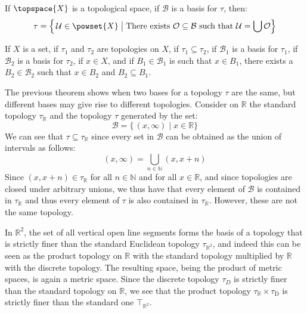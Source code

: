    \begin{theorem}
        If $\topspace{X}$ is a topological space, if $\mathcal{B}$ is a
        basis for $\tau$, then:
        \begin{equation}
            \tau=\Big\{\,\mathcal{U}\in\powset{X}\;\big|\;
                \textrm{There exists }\mathcal{O}\subseteq\mathcal{B}
                \textrm{ such that }\mathcal{U}=\bigcup\mathcal{O}\Big\}
        \end{equation}
    \end{theorem}
    \begin{theorem}
        If $X$ is a set, if $\tau_{1}$ and $\tau_{2}$ are topologies on $X$,
        if $\tau_{1}\subseteq\tau_{2}$, if $\mathcal{B}_{1}$ is a basis for
        $\tau_{1}$, if $\mathcal{B}_{2}$ is a basis for $\tau_{2}$, if
        $x\in{X}$, and if $B_{1}\in\mathcal{B}_{1}$ is such that
        $x\in{B}_{1}$, there exists a $B_{2}\in\mathcal{B}_{2}$ such that
        $x\in{B}_{2}$ and $B_{2}\subseteq{B}_{1}$.
    \end{theorem}
    \begin{example}
        The previous theorem shows when two bases for a topology $\tau$ are
        the same, but different bases may give rise to different topologies.
        Consider on $\mathbb{R}$ the standard topology $\tau_{\mathbb{R}}$
        and the topology $\tau$ generated by the set:
        \begin{equation}
            \mathcal{B}=\{\,(x,\infty)\;|\;x\in\mathbb{R}\}
        \end{equation}
        We can see that $\tau\subseteq\tau_{\mathbb{R}}$ since every set
        in $\mathcal{B}$ can be obtained as the union of intervals as
        follows:
        \begin{equation}
            (x,\infty)=\bigcup_{n\in\mathbb{N}}(x,x+n)
        \end{equation}
        Since $(x,x+n)\in\tau_{\mathbb{R}}$ for all $n\in\mathbb{N}$ and for
        all $x\in\mathbb{R}$, and since topologies are closed under
        arbitrary unions, we thus have that every element of $\mathcal{B}$
        is contained in $\tau_{\mathbb{R}}$ and thus every element of
        $\tau$ is also contained in $\tau_{\mathbb{R}}$. However, these are
        not the same topology.
    \end{example}
    \begin{example}
        In $\mathbb{R}^{2}$, the set of all vertical open line segments
        forms the basis of a topology that is strictly finer than the
        standard Euclidean topology $\tau_{\mathbb{R}^{2}}$, and indeed this
        can be seen as the product topology on $\mathbb{R}$ with the
        standard topology multiplied by $\mathbb{R}$ with the discrete
        topology. The resulting space, being the product of metric spaces,
        is again a metric space. Since the discrete topology $\tau_{D}$ is
        strictly finer than the standard topology on $\mathbb{R}$, we see
        that the product topology $\tau_{\mathbb{R}}\times\tau_{\mathrm{D}}$
        is strictly finer than the standard one $\top_{\mathbb{R}^{2}}$.
    \end{example}
